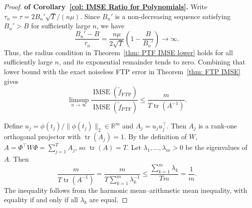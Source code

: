 \begin{proof}
\textbf{of Corollary~\ref{col: IMSE Ratio for Polynomials}.}
Write $\tau_n=\tau=2B_n'\sqrt T/(n\mu)$. Since $B_n'$ is a non-decreasing sequence  satisfying $B_n'>B$ for sufficiently large $n$, we have 
\[
\frac{B_n'-B}{\tau_n}
=
\frac{n\mu}{2\sqrt T}
\left(1-\frac{B}{B_n'}\right)
\longrightarrow\infty.
\]
Thus, the radius condition in Theorem~\ref{thm: PTF IMSE lower} holds for all sufficiently large $n$, and its exponential remainder tends to zero. Combining that lower bound with the exact noiseless FTP error in Theorem~\ref{thm: FTP IMSE} gives
\[
\limsup_{n\to\infty}
\frac{\operatorname{IMSE}(\widetilde f_{\mathrm{FTP}})}
     {\operatorname{IMSE}(\widetilde f_{\mathrm{PTF}})}
\le
\frac{m}{T\operatorname{tr}(A^{-1})}.
\]

Define $u_j=\phi(t_j)/\|\phi(t_j)\|_2\in\mathbb R^m$ and $A_j=u_ju_j^\top$. Then $A_j$ is a rank-one orthogonal projector with $\operatorname{tr}(A_j)=1$. By the definition of $W$, $A=\Phi^\top W\Phi=\sum_{j=1}^T A_j$, so $\operatorname{tr}(A)=T$. Let $\lambda_1,\ldots,\lambda_m>0$ be the eigenvalues of $A$. Then
\[
\frac{m}{T\operatorname{tr}(A^{-1})}
=
\frac{m}{T\sum_{k=1}^m\lambda_k^{-1}}
\le
\frac{\sum_{k=1}^m\lambda_k}{Tm}
=
\frac1m.
\]
The inequality follows from the harmonic mean--arithmetic mean inequality, with equality if and only if all $\lambda_k$ are equal.
\end{proof}